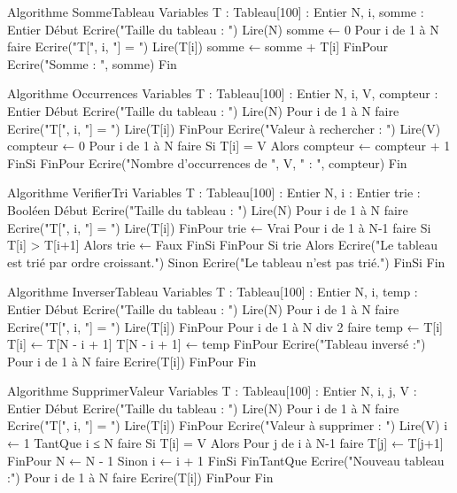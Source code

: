 \begin{algo}
Algorithme SommeTableau
Variables
    T : Tableau[100] : Entier
    N, i, somme : Entier
Début
    Ecrire("Taille du tableau : ")
    Lire(N)
    somme ← 0
    Pour i de 1 à N faire
        Ecrire("T[", i, "] = ")
        Lire(T[i])
        somme ← somme + T[i]
    FinPour
    Ecrire("Somme : ", somme)
Fin
\end{algo}

\begin{algo}
Algorithme Occurrences
Variables
    T : Tableau[100] : Entier
    N, i, V, compteur : Entier
Début
    Ecrire("Taille du tableau : ")
    Lire(N)
    Pour i de 1 à N faire
        Ecrire("T[", i, "] = ")
        Lire(T[i])
    FinPour
    Ecrire("Valeur à rechercher : ")
    Lire(V)
    compteur ← 0
    Pour i de 1 à N faire
        Si T[i] = V Alors
            compteur ← compteur + 1
        FinSi
    FinPour
    Ecrire("Nombre d'occurrences de ", V, " : ", compteur)
Fin
\end{algo}

\begin{algo}
Algorithme VerifierTri
Variables
    T : Tableau[100] : Entier
    N, i : Entier
    trie : Booléen
Début
    Ecrire("Taille du tableau : ")
    Lire(N)
    Pour i de 1 à N faire
        Ecrire("T[", i, "] = ")
        Lire(T[i])
    FinPour
    trie ← Vrai
    Pour i de 1 à N-1 faire
        Si T[i] > T[i+1] Alors
            trie ← Faux
        FinSi
    FinPour
    Si trie Alors
        Ecrire("Le tableau est trié par ordre croissant.")
    Sinon
        Ecrire("Le tableau n'est pas trié.")
    FinSi
Fin
\end{algo}

\begin{algo}
Algorithme InverserTableau
Variables
    T : Tableau[100] : Entier
    N, i, temp : Entier
Début
    Ecrire("Taille du tableau : ")
    Lire(N)
    Pour i de 1 à N faire
        Ecrire("T[", i, "] = ")
        Lire(T[i])
    FinPour
    Pour i de 1 à N div 2 faire
        temp ← T[i]
        T[i] ← T[N - i + 1]
        T[N - i + 1] ← temp
    FinPour
    Ecrire("Tableau inversé :")
    Pour i de 1 à N faire
        Ecrire(T[i])
    FinPour
Fin
\end{algo}

\begin{algo}
Algorithme SupprimerValeur
Variables
    T : Tableau[100] : Entier
    N, i, j, V : Entier
Début
    Ecrire("Taille du tableau : ")
    Lire(N)
    Pour i de 1 à N faire
        Ecrire("T[", i, "] = ")
        Lire(T[i])
    FinPour
    Ecrire("Valeur à supprimer : ")
    Lire(V)
    i ← 1
    TantQue i ≤ N faire
        Si T[i] = V Alors
            Pour j de i à N-1 faire
                T[j] ← T[j+1]
            FinPour
            N ← N - 1
        Sinon
            i ← i + 1
        FinSi
    FinTantQue
    Ecrire("Nouveau tableau :")
    Pour i de 1 à N faire
        Ecrire(T[i])
    FinPour
Fin
\end{algo}

